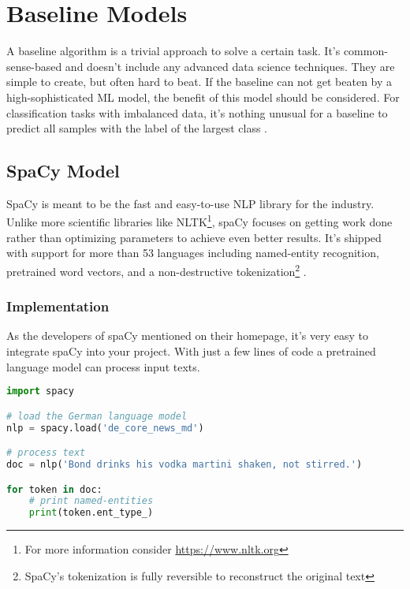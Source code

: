 \chapter{Baseline Models}

A baseline algorithm is a trivial approach to solve a certain task. It's common-sense-based and doesn't include any advanced data science techniques. They are simple to create, but often hard to beat. If the baseline can not get beaten by a high-sophisticated ML model, the benefit of this model should be considered. For classification tasks with imbalanced data, it's nothing unusual for a baseline to predict all samples with the label of the largest class \cite{rama18}.

\section{SpaCy Model}

SpaCy is meant to be the fast and easy-to-use NLP library for the industry. Unlike more scientific libraries like NLTK\footnote{For more information consider \url{https://www.nltk.org}}, spaCy focuses on getting work done rather than optimizing parameters to achieve even better results. It's shipped with support for more than 53 languages including named-entity recognition, pretrained word vectors, and a non-destructive tokenization\footnote{SpaCy's tokenization is fully reversible to reconstruct the original text} \cite{spacy}.

\subsection{Implementation}

As the developers of spaCy mentioned on their homepage, it's very easy to integrate spaCy into your project. With just a few lines of code a pretrained language model can process input texts.

\begin{lstlisting}[language=Python, label={code:spacy-integration}, caption=Sample of a runnable spaCy model]
import spacy

# load the German language model
nlp = spacy.load('de_core_news_md')

# process text
doc = nlp('Bond drinks his vodka martini shaken, not stirred.')

for token in doc:
    # print named-entities
    print(token.ent_type_)
\end{lstlisting}

